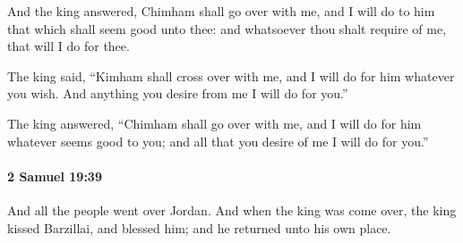 			\begin{versebox}
					\item[BHS] 
					\item[ASV] And the king answered, Chimham shall go over with me, and I will do to him that which shall seem good unto thee: and whatsoever thou shalt require of me, that will I do for thee.
					\item[NIV] The king said, “Kimham shall cross over with me, and I will do for him whatever you wish. And anything you desire from me I will do for you.”
					\item[NRSV] The king answered, “Chimham shall go over with me, and I will do for him whatever seems good to you; and all that you desire of me I will do for you.”
			\end{versebox}

		\paragraph{2 Samuel 19:39} %
			\label{2SAMUEL-19-39}

			And all the people went over Jordan. And when the king was come over, the king kissed Barzillai, and blessed him; and he returned unto his own place.

